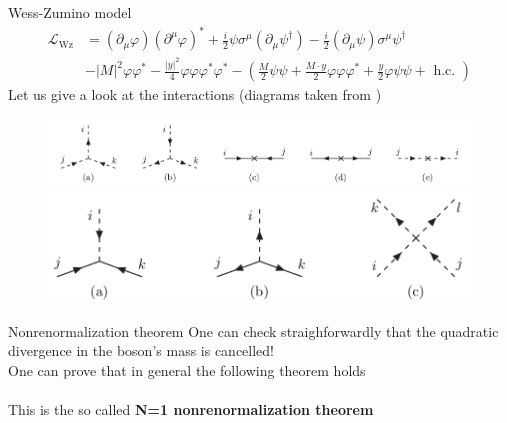 \documentclass[10pt]{beamer}
\begin{document}
\begin{frame}{Wess-Zumino model}
    \begin{equation*}
        \begin{aligned}
            \mathcal{L}_{\mathrm{Wz}} &=\left(\partial_{\mu} \varphi\right)\left(\partial^{\mu} \varphi\right)^{*}+\frac{i}{2} \psi \sigma^{\mu}\left(\partial_{\mu} \psi^{\dagger}\right)-\frac{i}{2}\left(\partial_{\mu} \psi\right) \sigma^{\mu} \psi^{\dagger} \\
            &-|M|^{2} \varphi \varphi^{*}-\frac{|y|^{2}}{4} \varphi \varphi \varphi^{*} \varphi^{*}-\left(\frac{M}{2} \psi \psi+\frac{M \cdot y}{2} \varphi \varphi \varphi^{*}+\frac{y}{2} \varphi \psi \psi+\text { h.c. }\right)
            \end{aligned}
    \end{equation*}
    Let us give a look at the interactions (diagrams taken from \cite{MARTIN_1998})
        \begin{figure}
            \centering
            \includegraphics[scale=0.22]{feynman1.png}
            \includegraphics[scale=0.22]{feynman2.png}
        \end{figure}
\end{frame}

\begin{frame}{Nonrenormalization theorem}
    One can check straighforwardly that the quadratic divergence in the boson's mass is cancelled! \\
    One can prove that in general the following theorem holds \\ 
    \vspace{15pt}
    \\
    \vspace*{15pt}
    This is the so called \textbf{N=1 nonrenormalization theorem}
\end{frame}
    
\end{document}

